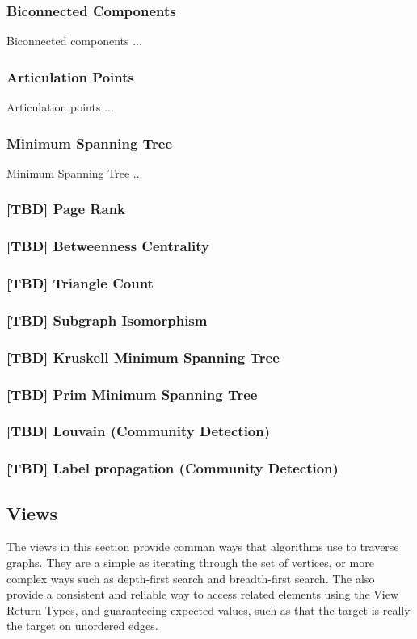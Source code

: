 \documentclass[10pt,onecolumn]{article}
\begin{document}
\subsubsection{Biconnected Components}
Biconnected components \cite{REF_} ...

\subsubsection{Articulation Points}
Articulation points \cite{REF_} ...

\subsubsection{Minimum Spanning Tree}
Minimum Spanning Tree \cite{REF_} ...

\subsubsection{[TBD] Page Rank}
\subsubsection{[TBD] Betweenness Centrality}
\subsubsection{[TBD] Triangle Count}
\subsubsection{[TBD] Subgraph Isomorphism}
\subsubsection{[TBD] Kruskell Minimum Spanning Tree}
\subsubsection{[TBD] Prim Minimum Spanning Tree}
\subsubsection{[TBD] Louvain (Community Detection)}
\subsubsection{[TBD] Label propagation (Community Detection)}

\subsection{Views}
The views in this section provide comman ways that algorithms use to traverse graphs. They are a simple as iterating through the set of vertices, or more complex ways such as depth-first search and breadth-first search. The also provide a consistent and reliable way to access related elements using the View Return Types, and guaranteeing expected values, such as that the target is really the target on unordered edges.
\end{document}
